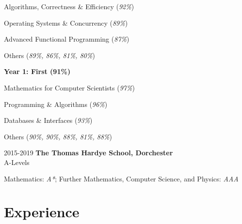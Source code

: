 \documentclass[12pt]{article}
\begin{document}
\begin{explist}
{\begin{explist}
\begin{explist}
				     \begin{multicols}{2}
				     \item Algorithms, Correctness \& Efficiency (\textit{92\%})
				     \item Operating Systems \& Concurrency (\textit{89\%})
				     \item Advanced Functional Programming (\textit{87\%})
				     \item Others (\textit{89\%, 86\%, 81\%, 80\%})
				     \end{multicols}
				 \end{explist}
    		   \item[] \textbf{Year 1: First (91\%)}
		   			\vspace*{-0.35cm}
		   			\begin{explist}
					  \begin{multicols}{2}
    		          \item Mathematics for Computer Scientists (\textit{97\%})
		              \item Programming \& Algorithms (\textit{96\%})
		              \item Databases \& Interfaces (\textit{93\%})
		              \item Others (\textit{90\%, 90\%, 88\%, 81\%, 88\%})
		              \end{multicols}
		            \end{explist}
		  \end{explist}
		  }
		  
	\item[2015-2019] \textbf{The Thomas Hardye School, Dorchester } \\
		A-Levels
		{\small
		\begin{explist}
			\item[] Mathematics: \textit{A*}; \quad Further Mathematics, Computer Science, and Physics: \textit{AAA}
		\end{explist}
		}
\end{explist}

\vspace{-1em}

\section*{Experience}
\end{document}
